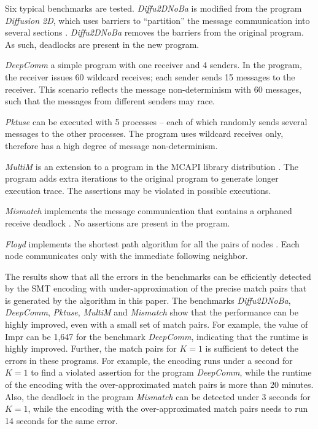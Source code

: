 Six typical benchmarks are tested. \textit{Diffu2DNoBa} is modified from the program \textit{Diffusion 2D}, which uses barriers to “partition” the message communication into several sections \cite{}. \textit{Diffu2DNoBa} removes the barriers from the original program. As such, deadlocks are present in the new program.

\textit{DeepComm} a simple program with one receiver and 4 senders. In the program, the receiver issues 60 wildcard receives; each sender sends 15 messages to the receiver.
This scenario reflects the message non-determinism with 60 messages, such that the messages from different senders may race.

\textit{Pktuse} can be executed with 5 processes -- each of which randomly sends several messages to the other processes. The program uses wildcard receives only, therefore has a high degree of message non-determinism.

\textit{MultiM} is an extension to a program in the MCAPI library distribution \cite{}. The program adds extra iterations to the original program to generate longer execution trace. The assertions may be violated in possible executions.

\textit{Mismatch} implements the message communication that contains a orphaned receive deadlock \cite{}. No assertions are present in the program.

\textit{Floyd} implements the shortest path algorithm for all the pairs of nodes \cite{}. Each node communicates only with the immediate following neighbor. 

The results show that all the errors in the benchmarks can be efficiently detected by the SMT encoding with under-approximation of the precise match pairs that is generated by the algorithm in this paper. The benchmarks \textit{Diffu2DNoBa}, \textit{DeepComm}, \textit{Pktuse}, \textit{MultiM} and \textit{Mismatch} show that the performance can be highly improved, even with a small set of match pairs. For example, the value of $\mathrm{Impr}$ can be 1,647 for the benchmark \textit{DeepComm}, indicating that the runtime is highly improved.
Further, the match pairs for $K=1$ is sufficient to detect the errors in these programs. 
For example, the encoding runs under a second for $K=1$ to find a violated assertion for the program \textit{DeepComm}, while the runtime of the encoding with the over-approximated match pairs is more than 20 minutes. Also, the deadlock in the program \textit{Mismatch} can be detected under 3 seconds for $K=1$, while the encoding with the over-approximated match pairs needs to run 14 seconds for the same error. 

